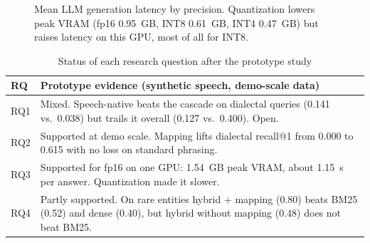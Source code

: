 \documentclass[conference]{IEEEtran}
\begin{document}
\begin{figure}[t]
\centering
{}
\caption{Mean LLM generation latency by precision. Quantization lowers peak VRAM (fp16 0.95~GB, INT8 0.61~GB, INT4 0.47~GB) but raises latency on this GPU, most of all for INT8.}
\label{fig:quant-chart}
\end{figure}

\begin{table}[t]
\caption{Status of each research question after the prototype study}
\centering
\footnotesize
\begin{tabularx}{\columnwidth}{@{}lX@{}}
\toprule
\textbf{RQ} & \textbf{Prototype evidence (synthetic speech, demo-scale data)} \\
\midrule
RQ1 & Mixed. Speech-native beats the cascade on dialectal queries (0.141 vs.\ 0.038) but trails it overall (0.127 vs.\ 0.400). Open. \\
RQ2 & Supported at demo scale. Mapping lifts dialectal recall@1 from 0.000 to 0.615 with no loss on standard phrasing. \\
RQ3 & Supported for fp16 on one GPU: 1.54~GB peak VRAM, about 1.15~s per answer. Quantization made it slower. \\
RQ4 & Partly supported. On rare entities hybrid + mapping (0.80) beats BM25 (0.52) and dense (0.40), but hybrid without mapping (0.48) does not beat BM25. \\
\bottomrule
\end{tabularx}
\label{tab:rq}
\end{table}
\end{document}
